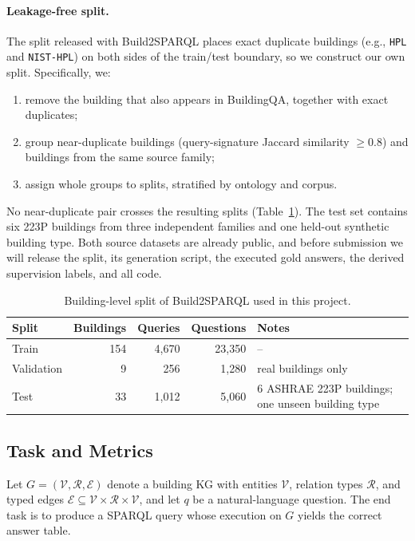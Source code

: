\documentclass[11pt]{article}
\newcommand{\code}[1]{\texttt{#1}}
\begin{document}
\paragraph{Leakage-free split.}
The split released with Build2SPARQL places exact duplicate buildings (e.g., \code{HPL} and \code{NIST-HPL}) on both sides of the train/test boundary, so we construct our own split. Specifically, we:
\begin{enumerate}
  \item remove the building that also appears in BuildingQA, together with exact duplicates;
  \item group near-duplicate buildings (query-signature Jaccard similarity $\geq 0.8$) and buildings from the same source family;
  \item assign whole groups to splits, stratified by ontology and corpus.
\end{enumerate}
No near-duplicate pair crosses the resulting splits (Table~\ref{tab:split}). The test set contains six 223P buildings from three independent families and one held-out synthetic building type. Both source datasets are already public, and before submission we will release the split, its generation script, the executed gold answers, the derived supervision labels, and all code.

\begin{table}[h]
\centering
\small
\caption{Building-level split of Build2SPARQL used in this project.}
\label{tab:split}
\begin{tabular}{@{}lrrrl@{}}
\toprule
Split & Buildings & Queries & Questions & Notes \\
\midrule
Train      & 154 & 4{,}670 & 23{,}350 & -- \\
Validation &   9 &     256 &  1{,}280 & real buildings only \\
Test       &  33 & 1{,}012 &  5{,}060 & 6 ASHRAE 223P buildings; one unseen building type \\
\bottomrule
\end{tabular}
\end{table}

\subsection{Task and Metrics}

Let $G=(\mathcal{V},\mathcal{R},\mathcal{E})$ denote a building KG with entities $\mathcal{V}$, relation types $\mathcal{R}$, and typed edges $\mathcal{E}\subseteq\mathcal{V}\times\mathcal{R}\times\mathcal{V}$, and let $q$ be a natural-language question. The end task is to produce a SPARQL query whose execution on $G$ yields the correct answer table.
\end{document}
